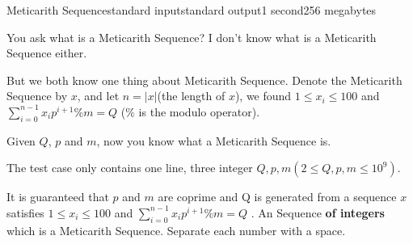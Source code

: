 \begin{problem}{Meticarith Sequence}{standard input}{standard output}{1 second}{256 megabytes}

    You ask what is a Meticarith Sequence? I don't know what is a Meticarith Sequence either.

    But we both know one thing about Meticarith Sequence. Denote the Meticarith Sequence by $x$, and let $n=|x|$(the length of $x$), we found $1\le x_i\le 100$ and $\sum_{i=0}^{n-1}x_i p^{i+1}\%m=Q$ ($\%$ is the modulo operator).
    
    Given $Q$, $p$ and $m$, now you know what a Meticarith Sequence is.
    
\InputFile
The test case only contains one line, three integer $Q,p,m(2\le Q,p,m \le 10^9)$.

It is guaranteed that $p$ and $m$ are coprime and Q is generated from  a sequence $x$ satisfies $1\le x_i\le 100$ and $\sum_{i=0}^{n-1}x_i p^{i+1}\%m=Q$ .
\OutputFile
An Sequence \textbf{of integers} which is a Meticarith Sequence. Separate each number with a space.

\Example

\begin{example}
%
\end{example}

\end{problem}
